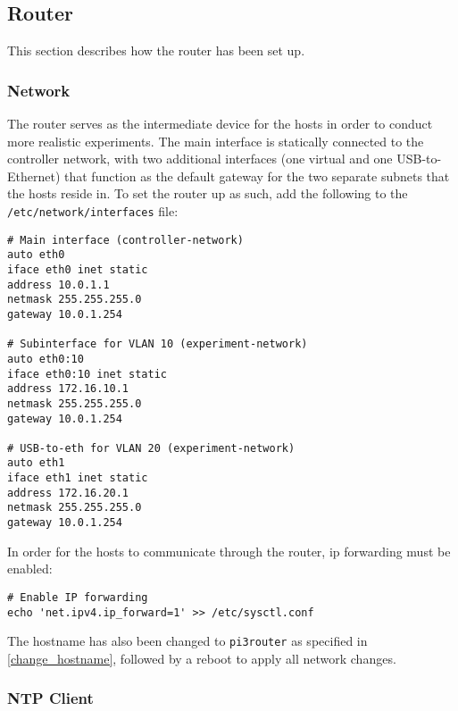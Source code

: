 






\subsection{Router}

This section describes how the router has been set up. 


\subsubsection{Network}

The router serves as the intermediate device for the hosts in order to conduct more realistic experiments. The main interface is statically connected to the controller network, with two additional interfaces (one virtual and one USB-to-Ethernet) that function as the default gateway for the two separate subnets that the hosts reside in. To set the router up as such, add the following to the \lstinline{/etc/network/interfaces} file:

\begin{verbatim}
# Main interface (controller-network)
auto eth0
iface eth0 inet static
address 10.0.1.1
netmask 255.255.255.0
gateway 10.0.1.254

# Subinterface for VLAN 10 (experiment-network)
auto eth0:10
iface eth0:10 inet static
address 172.16.10.1
netmask 255.255.255.0
gateway 10.0.1.254

# USB-to-eth for VLAN 20 (experiment-network)
auto eth1
iface eth1 inet static
address 172.16.20.1
netmask 255.255.255.0
gateway 10.0.1.254
\end{verbatim}

In order for the hosts to communicate through the router, \gls{ip} forwarding must be enabled:

\begin{verbatim}
# Enable IP forwarding
echo 'net.ipv4.ip_forward=1' >> /etc/sysctl.conf
\end{verbatim}

The hostname has also been changed to \lstinline{pi3router} as specified in \ref{change_hostname}, followed by a reboot to apply all network changes.


\subsubsection{NTP Client}

